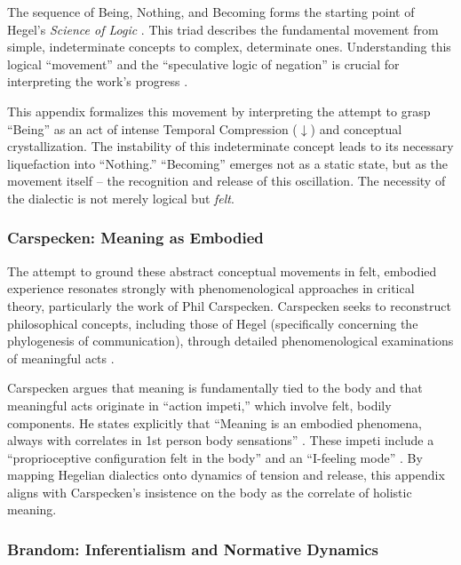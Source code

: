 \documentclass[12pt]{book}
\begin{document}
The sequence of Being, Nothing, and Becoming forms the starting point of Hegel's \textit{Science of Logic} \parencite{inwood1992hegel, Hegel1830Logic}. This triad describes the fundamental movement from simple, indeterminate concepts to complex, determinate ones. Understanding this logical ``movement'' and the ``speculative logic of negation'' is crucial for interpreting the work's progress \parencite[p. 38]{Pippin:2019aa}.

This appendix formalizes this movement by interpreting the attempt to grasp ``Being'' as an act of intense Temporal Compression ($\downarrow$) and conceptual crystallization. The instability of this indeterminate concept leads to its necessary liquefaction into ``Nothing.'' ``Becoming'' emerges not as a static state, but as the movement itself -- the recognition and release of this oscillation. The necessity of the dialectic is not merely logical but \textit{felt}.

\subsubsection{Carspecken: Meaning as Embodied}

The attempt to ground these abstract conceptual movements in felt, embodied experience resonates strongly with phenomenological approaches in critical theory, particularly the work of Phil Carspecken. Carspecken seeks to reconstruct philosophical concepts, including those of Hegel (specifically concerning the phylogenesis of communication), through detailed phenomenological examinations of meaningful acts \parencite{Carspecken1999}.

Carspecken argues that meaning is fundamentally tied to the body and that meaningful acts originate in ``action impeti,'' which involve felt, bodily components. He states explicitly that ``Meaning is an embodied phenomena, always with correlates in 1st person body sensations'' \parencite[p. 20]{Carspecken1995aa}. These impeti include a ``proprioceptive configuration felt in the body'' and an ``I-feeling mode'' \parencite[p. 20]{Carspecken1995aa}. By mapping Hegelian dialectics onto dynamics of tension and release, this appendix aligns with Carspecken's insistence on the body as the correlate of holistic meaning.

\subsubsection{Brandom: Inferentialism and Normative Dynamics}
\end{document}

